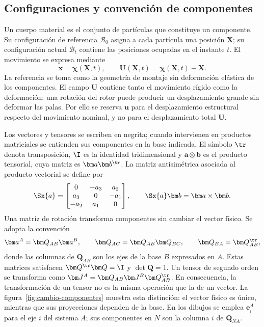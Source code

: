 

\subsection{Configuraciones y convención de componentes}
Un cuerpo material es el conjunto de partículas que constituye un componente. Su configuración de referencia $\mathcal B_0$ asigna a cada partícula una posición $\bm X$; su configuración actual $\mathcal B_t$ contiene las posiciones ocupadas en el instante $t$. El movimiento se expresa mediante
\begin{equation}
\bm x=\bm\chi(\bm X,t),\qquad
\bm U(\bm X,t)=\bm\chi(\bm X,t)-\bm X.
\label{eq:configuraciones}
\end{equation}
La referencia se toma como la geometría de montaje sin deformación elástica de los componentes. El campo $\bm U$ contiene tanto el movimiento rígido como la deformación: una rotación del rotor puede producir un desplazamiento grande sin deformar las palas. Por ello se reserva $\bm u$ para el desplazamiento estructural respecto del movimiento nominal, y no para el desplazamiento total $\bm U$.

Los vectores y tensores se escriben en negrita; cuando intervienen en productos matriciales se entienden sus componentes en la base indicada. El símbolo $\tr$ denota transposición, $\I$ es la identidad tridimensional y $\bm a\otimes\bm b$ es el producto tensorial, cuya matriz es $\bm a\bm b^\tr$. La matriz antisimétrica asociada al producto vectorial se define por
\begin{equation}
\Sx{a}=
\begin{bmatrix}0&-a_3&a_2\\a_3&0&-a_1\\-a_2&a_1&0\end{bmatrix},
\qquad \Sx{a}\bm b=\bm a\times\bm b.
\label{eq:skew}
\end{equation}
Una matriz de rotación transforma componentes sin cambiar el vector físico. Se adopta la convención
\begin{equation}
\bm a^A=\bm Q_{AB}\bm a^B,\qquad
\bm Q_{AC}=\bm Q_{AB}\bm Q_{BC},\qquad
\bm Q_{BA}=\bm Q_{AB}^\tr,
\label{eq:cambio-base}
\end{equation}
donde las columnas de $\bm Q_{AB}$ son los ejes de la base $B$ expresados en $A$. Estas matrices satisfacen $\bm Q^\tr\bm Q=\I$ y $\det\bm Q=1$. Un tensor de segundo orden se transforma como $\bm J^A=\bm Q_{AB}\bm J^B\bm Q_{AB}^\tr$. En consecuencia, la transformación de un tensor no es la misma operación que la de un vector.
La figura~\ref{fig:cambio-componentes} muestra esta distinción: el vector físico es único, mientras que sus proyecciones dependen de la base. En los dibujos se emplea $\bm e_i^A$ para el eje $i$ del sistema $A$; sus componentes en $N$ son la columna $i$ de $\bm Q_{NA}$.


